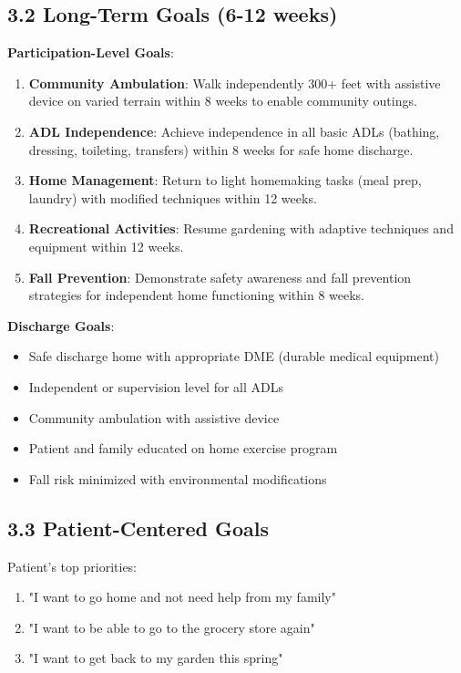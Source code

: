 \documentclass[11pt,letterpaper]{article}
\begin{document}
\subsection*{3.2 Long-Term Goals (6-12 weeks)}

\textbf{Participation-Level Goals}:
\begin{enumerate}[leftmargin=*]
    \item \textbf{Community Ambulation}: Walk independently 300+ feet with assistive device on varied terrain within 8 weeks to enable community outings.
    
    \item \textbf{ADL Independence}: Achieve independence in all basic ADLs (bathing, dressing, toileting, transfers) within 8 weeks for safe home discharge.
    
    \item \textbf{Home Management}: Return to light homemaking tasks (meal prep, laundry) with modified techniques within 12 weeks.
    
    \item \textbf{Recreational Activities}: Resume gardening with adaptive techniques and equipment within 12 weeks.
    
    \item \textbf{Fall Prevention}: Demonstrate safety awareness and fall prevention strategies for independent home functioning within 8 weeks.
\end{enumerate}

\textbf{Discharge Goals}:
\begin{itemize}[leftmargin=*]
    \item Safe discharge home with appropriate DME (durable medical equipment)
    \item Independent or supervision level for all ADLs
    \item Community ambulation with assistive device
    \item Patient and family educated on home exercise program
    \item Fall risk minimized with environmental modifications
\end{itemize}

\subsection*{3.3 Patient-Centered Goals}

Patient's top priorities:
\begin{enumerate}[leftmargin=*]
    \item "I want to go home and not need help from my family"
    \item "I want to be able to go to the grocery store again"
    \item "I want to get back to my garden this spring"
\end{enumerate}
\end{document}
